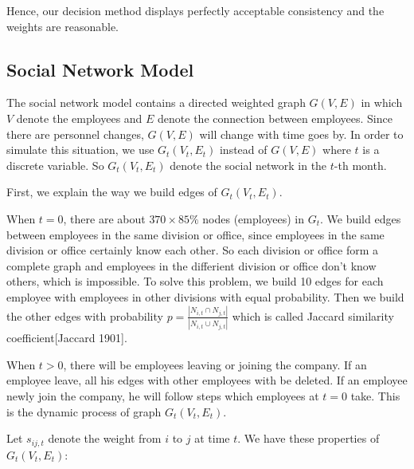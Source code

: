\documentclass[12pt,a4paper,titlepage]{article}
\begin{document}
Hence, our decision method displays perfectly acceptable consistency
and the weights are reasonable.

\subsection{Social Network Model}
\label{sec:social-network-model}

The social network model contains a directed weighted graph $G(V,E)$
in which $V$ denote the employees and $E$ denote the connection
between employees. Since there are personnel changes, $G(V,E)$ will
change with time goes by. In order to simulate this situation, we use
$G_t(V_t,E_t)$ instead of $G(V,E)$ where $t$ is a discrete
variable. So $G_t(V_t,E_t)$ denote the social network in the $t$-th
month.

First, we explain the way we build edges of $G_t(V_t,E_t)$.

When $t = 0$, there are about $370 \times 85\%$ nodes (employees) in
$G_t$. We build edges between employees in the same division or
office, since employees in the same division or office certainly know
each other. So each division or office form a complete graph and
employees in the differient division or office don't know others,
which is impossible. To solve this problem, we build 10 edges for each
employee with employees in other divisions with equal
probability. Then we build the other edges with probability
$p = \frac{\left|N_{i,t} \cap N_{j,t}\right|}{\left|N_{i,t} \cup
    N_{j,t}\right|}$
which is called Jaccard similarity coefficient[Jaccard 1901].

When $t > 0$, there will be employees leaving or joining the
company. If an employee leave, all his edges with other employees with
be deleted. If an employee newly join the company, he will follow
steps which employees at $t = 0$ take. This is the dynamic process of
graph $G_t(V_t,E_t)$.

Let $s_{ij,t}$ denote the weight from $i$ to $j$ at time $t$. We have
these properties of $G_t(V_t,E_t)$:
\end{document}
